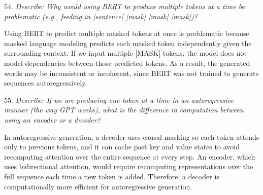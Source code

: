 \vspace{1cm}

54. \textit{Describe: Why would using BERT to produce multiple tokens at a time be problematic (e.g., feeding in [sentence] [mask] [mask] [mask])?}

Using BERT to predict multiple masked tokens at once is problematic because masked language modeling predicts each masked token independently given the surrounding context. If we input multiple [MASK] tokens, the model does not model dependencies between those predicted tokens. As a result, the generated words may be inconsistent or incoherent, since BERT was not trained to generate sequences autoregressively.

\vspace{1cm}

55. \textit{Describe: If we are producing one token at a time in an autoregressive manner (the way GPT works), what is the difference in computation between using an encoder or a decoder?}

In autoregressive generation, a decoder uses causal masking so each token attends only to previous tokens, and it can cache past key and value states to avoid recomputing attention over the entire sequence at every step. An encoder, which uses bidirectional attention, would require recomputing representations over the full sequence each time a new token is added. Therefore, a decoder is computationally more efficient for autoregressive generation.